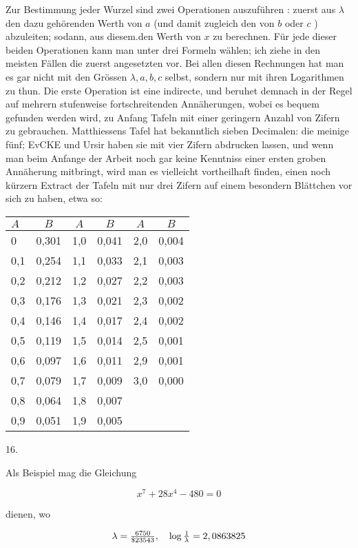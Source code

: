 \documentclass[twoside,12pt, showframe]{memoir}
\let\oldfrac\frac
\def\frac#1#2{\mathchoice{\tfrac{#1}{#2}}{\oldfrac{#1}{#2}}{\genfrac{}{}{}{2}{#1}{#2\mathstrut}}{\genfrac{}{}{}{3}{#1}{#2\mathstrut}}}
\begin{document}
Zur Bestimmung jeder Wurzel sind zwei Operationen auszuführen : zuerst aus \(\lambda\) den dazu gehörenden Werth von \(a\) (und damit zugleich den von \(b\) oder \(c\) ) abzuleiten; sodann, aus diesem.den Werth von \(x\) zu berechnen. Für jede dieser beiden Operationen kann man unter drei Formeln wählen; ich ziehe in den meisten Fällen die zuerst angesetzten vor. Bei allen diesen Rechnungen hat man es gar nicht mit den Grössen \(\lambda, a, b, c\) selbst, sondern nur mit ihren Logarithmen zu thun. Die erste Operation ist eine indirecte, und beruhet demnach in der Regel auf mehrern stufenweise fortschreitenden Annäherungen, wobei es bequem gefunden werden wird, zu Anfang Tafeln mit einer geringern Anzahl von Zifern zu gebrauchen. Matthiessens Tafel hat bekanntlich sieben Decimalen: die meinige fünf; EvCKE und Ursir haben sie mit vier Zifern abdrucken lassen, und wenn man beim Anfange der Arbeit noch gar keine Kenntniss einer ersten groben Annäherung mitbringt, wird man es vielleicht vortheilhaft finden, einen noch kürzern Extract der Tafeln mit nur drei Zifern auf einem besondern Blättchen vor sich zu haben, etwa so:

\begin{center}
\begin{tabular}{l|c|c|c|c|c}
\(A\) & \(B\) & \(A\) & \(B\) & \(A\) & \(B\) \\
\hline
0 & 0,301 & 1,0 & 0,041 & 2,0 & 0,004 \\
0,1 & 0,254 & 1,1 & 0,033 & 2,1 & 0,003 \\
0,2 & 0,212 & 1,2 & 0,027 & 2,2 & 0,003 \\
0,3 & 0,176 & 1,3 & 0,021 & 2,3 & 0,002 \\
0,4 & 0,146 & 1,4 & 0,017 & 2,4 & 0,002 \\
0,5 & 0,119 & 1,5 & 0,014 & 2,5 & 0,001 \\
0,6 & 0,097 & 1,6 & 0,011 & 2,9 & 0,001 \\
0,7 & 0,079 & 1,7 & 0,009 & 3,0 & 0,000 \\
0,8 & 0,064 & 1,8 & 0,007 &  &  \\
0,9 & 0,051 & 1,9 & 0,005 &  &  \\
\end{tabular}
\end{center}

16.

Als Beispiel mag die Gleichung

\[
x^{7}+28 x^{4}-480=0
\]

dienen, wo

\[
\lambda=\frac{6750}{\$ 23543}, \quad \log \frac{1}{\lambda}=2,0863825
\]
\end{document}
